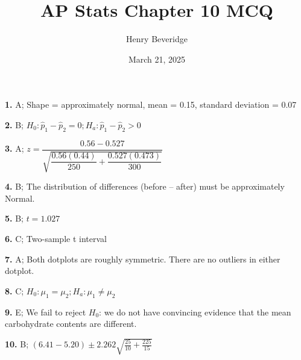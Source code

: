 \documentclass{article}
\title{AP Stats Chapter 10 MCQ}
\author{Henry Beveridge}
\date{March 21, 2025}
\begin{document}
\maketitle

\textbf{1.} A; Shape = approximately normal, mean = 0.15, standard deviation = 0.07

\textbf{2.} B; $H_0: \hat{p}_1 - \hat{p}_2 = 0; H_a: \hat{p}_1 - \hat{p}_2 > 0$

\textbf{3.} A; $z=\dfrac{0.56 - 0.527}{\sqrt{\dfrac{0.56(0.44)}{250} + \dfrac{0.527(0.473)}{300}}}$

\textbf{4.} B; The distribution of differences (before – after) must be approximately Normal.

\textbf{5.} B; $t=1.027$

\textbf{6.} C; Two-sample t interval

\textbf{7.} A; Both dotplots are roughly symmetric. There are no outliers in either dotplot.

\textbf{8.} C; $H_0: \mu_1 = \mu_2; H_a: \mu_1 \neq \mu_2$

\textbf{9.} E; We fail to reject $H_0$: we do not have convincing evidence that the mean carbohydrate contents are
different.

\textbf{10.} B; $(6.41-5.20)\pm2.262\sqrt{\frac{25}{10}+\frac{225}{15}}$
\end{document}
